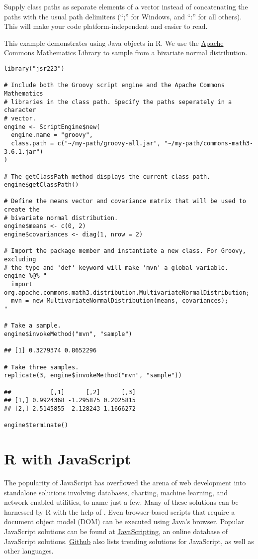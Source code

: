  Supply class paths as separate elements of a vector instead of concatenating the paths with the usual path delimiters (“;” for Windows, and “:” for all others). This will make your code platform-independent and easier to read.

This example demonstrates using Java objects in R. We use the \href{http://commons.apache.org/proper/commons-math/}{Apache Commons Mathematics Library} to sample from a bivariate normal distribution. %

\begin{verbatim}
library("jsr223")

# Include both the Groovy script engine and the Apache Commons Mathematics
# libraries in the class path. Specify the paths seperately in a character
# vector.
engine <- ScriptEngine$new(
  engine.name = "groovy",
  class.path = c("~/my-path/groovy-all.jar", "~/my-path/commons-math3-3.6.1.jar")
)

# The getClassPath method displays the current class path.
engine$getClassPath()

# Define the means vector and covariance matrix that will be used to create the
# bivariate normal distribution.
engine$means <- c(0, 2)
engine$covariances <- diag(1, nrow = 2)

# Import the package member and instantiate a new class. For Groovy, excluding
# the type and 'def' keyword will make 'mvn' a global variable.
engine %@% "
  import org.apache.commons.math3.distribution.MultivariateNormalDistribution;
  mvn = new MultivariateNormalDistribution(means, covariances);
"

# Take a sample.
engine$invokeMethod("mvn", "sample")

## [1] 0.3279374 0.8652296

# Take three samples.
replicate(3, engine$invokeMethod("mvn", "sample"))

##           [,1]      [,2]      [,3]
## [1,] 0.9924368 -1.295875 0.2025815
## [2,] 2.5145855  2.128243 1.1666272

engine$terminate()
\end{verbatim}

\section{R with JavaScript}

The popularity of JavaScript has overflowed the arena of web development into standalone solutions involving databases, charting, machine learning, and network-enabled utilities, to name just a few. Many of these solutions can be harnessed by R with the help of . Even browser-based scripts that require a document object model (DOM) can be executed using Java's  browser. Popular JavaScript solutions can be found at \href{https://www.javascripting.com/}{JavaScripting}, an online database of JavaScript solutions. \href{https://github.com/trending/javascript?since=monthly}{Github} also lists trending solutions for JavaScript, as well as other languages.

